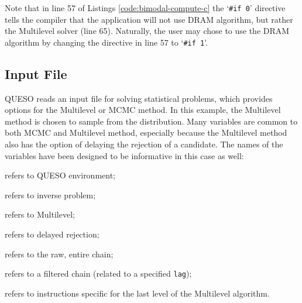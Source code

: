 



Note that in line 57 of Listings \ref{code:bimodal-compute-c} the `\verb+#if 0+' directive tells the compiler that the application will not use DRAM algorithm, but rather the Multilevel solver (line 65). Naturally, the user may chose to use the DRAM algorithm by changing the directive in line 57 to `\verb+#if 1+'.






\subsection{Input File}\label{sec:bimodal-input-file}


QUESO reads an input file for solving statistical problems, which provides options for the Multilevel or MCMC method. In this example, the Multilevel method is chosen to sample from the distribution. Many variables are common to both MCMC and Multilevel method, especially because the Multilevel method also has the option of delaying the rejection of a candidate. The names of the variables have been designed to be informative in this case as well:
\begin{description}\vspace{-8pt}
\item[ \texttt{env}:] refers to QUESO environment; \vspace{-8pt}
\item[ \texttt{ip}:] refers to inverse problem;\vspace{-8pt}
\item[ \texttt{ml}:] refers to Multilevel;\vspace{-8pt}
\item[ \texttt{dr}:] refers to delayed rejection;\vspace{-8pt}
\item[ \texttt{rawChain}:] refers to the raw, entire chain; \vspace{-8pt}
\item[ \texttt{filteredChain}:] refers to a filtered chain (related to a specified \texttt{lag});\vspace{-8pt}
\item[ \texttt{last}:] refers to instructions specific for the last level of the Multilevel algorithm.
\end{description}

